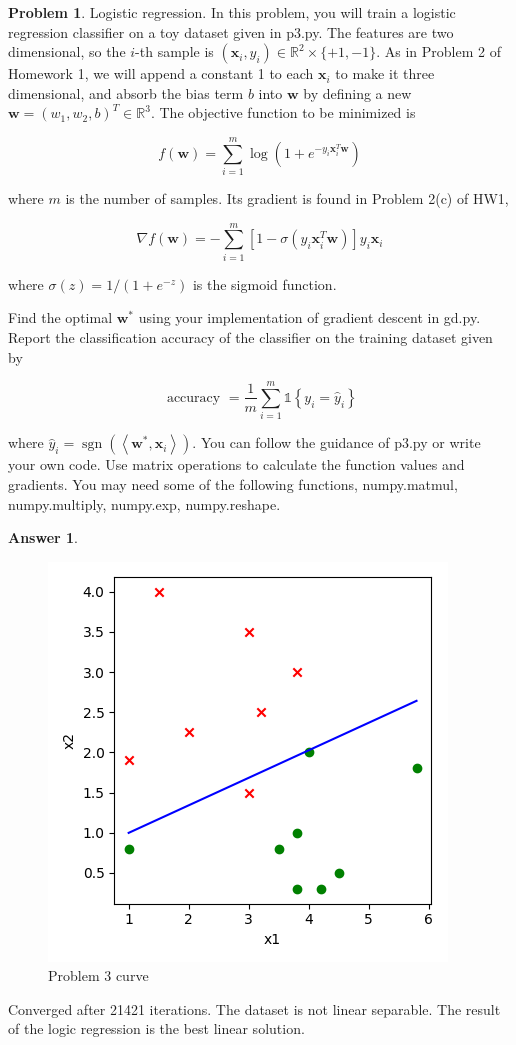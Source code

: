 \documentclass{article}
\theoremstyle{definition}
\newtheorem{prob}{Problem}
\newtheorem{ans}{Answer}
\begin{document}
	\begin{prob}
	Logistic regression. In this problem, you will train a logistic regression classifier on a toy dataset given in p3.py. The features are two dimensional, so the $i$-th sample is $\left(\boldsymbol{x}_{i}, y_{i}\right) \in \mathbb{R}^{2} \times\{+1,-1\}$. As in Problem 2 of Homework 1, we will append a constant 1 to each $\boldsymbol{x}_{i}$ to make it three dimensional, and absorb the bias term $b$ into $\boldsymbol{w}$ by defining a new $\boldsymbol{w}=\left(w_{1}, w_{2}, b\right)^{T} \in \mathbb{R}^{3}$. The objective function to be minimized is
	
	$$
	f(\boldsymbol{w})=\sum_{i=1}^{m} \log \left(1+e^{-y_{i} \boldsymbol{x}_{i}^{T} \boldsymbol{w}}\right)
	$$
	
	where $m$ is the number of samples. Its gradient is found in Problem 2(c) of HW1,
	
	$$
	\nabla f(\boldsymbol{w})=-\sum_{i=1}^{m}\left[1-\sigma\left(y_{i} \boldsymbol{x}_{i}^{T} \boldsymbol{w}\right)\right] y_{i} \boldsymbol{x}_{i}
	$$
	
	where $\sigma(z)=1 /\left(1+e^{-z}\right)$ is the sigmoid function.
	
	Find the optimal $\boldsymbol{w}^{*}$ using your implementation of gradient descent in gd.py. Report the classification accuracy of the classifier on the training dataset given by
	
	$$
	\text { accuracy }=\frac{1}{m} \sum_{i=1}^{m} \mathbb{1}\left\{y_{i}=\hat{y}_{i}\right\}
	$$
	
	where $\hat{y}_{i}=\operatorname{sgn}\left(\left\langle\boldsymbol{w}^{*}, \boldsymbol{x}_{i}\right\rangle\right)$. You can follow the guidance of p3.py or write your own code. Use matrix operations to calculate the function values and gradients. You may need some of the following functions, numpy.matmul, numpy.multiply, numpy.exp, numpy.reshape.
	\end{prob}

	\begin{ans}
		\begin{figure}
			\centering
			\includegraphics[width=0.5\linewidth]{../figures/p3}
			\caption{Problem 3 curve}
			\label{fig:p3}
		\end{figure}
	
		Converged after 21421 iterations. The dataset is not linear separable. The result of the logic regression is the best linear solution. 
	\end{ans}
\end{document}
